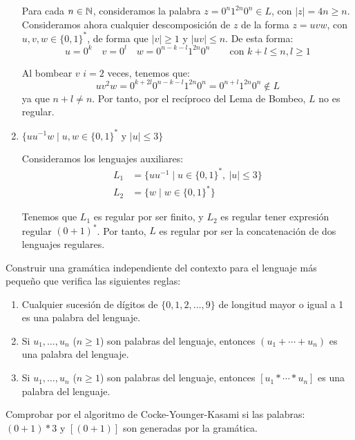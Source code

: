 \begin{ejercicio}
\begin{enumerate}
        Para cada $n\in \mathbb{N}$, consideramos la palabra $z=0^{n}1^{2n}0^{n}\in L$, con $|z|=4n\geq n$. Consideramos ahora cualquier descomposición de $z$ de la forma $z=uvw$, con $u,v,w\in {\{0,1\}}^{\ast}$, de forma que $|v|\geq 1$ y $|uv|\leq n$. De esta forma:
        \begin{equation*}
            u=0^k \quad v=0^l \quad w=0^{n-k-l}1^{2n}0^n\qquad \text{con } k+l\leq n, l\geq 1
        \end{equation*}

        Al bombear $v$ $i=2$ veces, tenemos que:
        \begin{equation*}
            uv^2w = 0^{k+2l}0^{n-k-l}1^{2n}0^n = 0^{n+l}1^{2n}0^n \notin L
        \end{equation*}
        ya que $n+l\neq n$. Por tanto, por el recíproco del Lema de Bombeo, $L$ no es regular.

        \item $\{uu^{-1}w \mid u,w\in {\{0,1\}}^{\ast} \text{\ y\ } |u|\leq 3\}$
        
        Consideramos los lenguajes auxiliares:
        \begin{align*}
            L_1 &= \{uu^{-1}\mid u\in {\{0,1\}}^{\ast},~|u|\leq 3\} \\
            L_2 &= \{w\mid w\in {\{0,1\}}^{\ast}\}
        \end{align*}

        Tenemos que $L_1$ es regular por ser finito, y $L_2$ es regular tener expresión regular $(0+1)^{\ast}$. Por tanto, $L$ es regular por ser la concatenación de dos lenguajes regulares.
    \end{enumerate}
\end{ejercicio}

\begin{ejercicio}\label{ej:1.6.10}
    Construir una gramática independiente del contexto para el lenguaje más pequeño que verifica las siguientes reglas:
    \begin{enumerate}
        \item Cualquier sucesión de dígitos de $\{0,1,2,\ldots, 9\}$ de longitud mayor o igual a 1 es una palabra del lenguaje.
        \item Si $u_1,\ldots,u_n$ ($n\geq 1$) son palabras del lenguaje, entonces $(u_1+\cdots + u_n)$ es una palabra del lenguaje.
        \item Si $u_1,\ldots,u_n$ ($n\geq 1$) son palabras del lenguaje, entonces $[u_1 \ast \cdots \ast u_n]$ es una palabra del lenguaje.
    \end{enumerate}
    Comprobar por el algoritmo de Cocke-Younger-Kasami si las palabras: $(0+1)*3$ y $[(0+1)]$ son generadas por la gramática.\\

\end{ejercicio}

